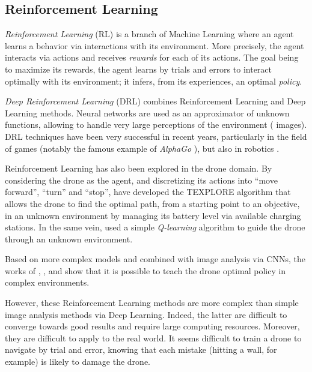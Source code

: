 \subsection{Reinforcement Learning}

\emph{Reinforcement Learning} (RL) is a branch of Machine Learning where an agent learns a behavior via interactions with its environment. More precisely, the agent interacts via actions and receives \emph{rewards} for each of its actions. The goal being to maximize its rewards, the agent learns by trials and errors to interact optimally with its environment; it infers, from its experiences, an optimal \emph{policy}.

\emph{Deep Reinforcement Learning} (DRL) combines Reinforcement Learning and Deep Learning methods. Neural networks are used as an approximator of unknown functions, allowing to handle very large perceptions of the environment (\eg{} images). DRL techniques have been very successful in recent years, particularly in the field of games \cite{shao2019survey} (notably the famous example of \emph{AlphaGo} \cite{silver2016mastering}), but also in robotics \cite{kober2013reinforcement}.

Reinforcement Learning has also been explored in the drone domain. By considering the drone as the agent, and discretizing its actions into \enquote{move forward}, \enquote{turn} and \enquote{stop}, \textcite{imanberdiyev2016autonomous} have developed the TEXPLORE algorithm that allows the drone to find the optimal path, from a starting point to an objective, in an unknown environment by managing its battery level via available charging stations. In the same vein, \textcite{pham2018autonomous} used a simple \emph{Q-learning} algorithm to guide the drone through an unknown environment.

Based on more complex models and combined with image analysis via CNNs, the works of \textcite{walker2019deep}, \textcite{wang2019autonomous}, \textcite{he2020explainable} and \textcite{guerra2020reinforcement} show that it is possible to teach the drone optimal policy in complex environments.

However, these Reinforcement Learning methods are more complex than simple image analysis methods via Deep Learning. Indeed, the latter are difficult to converge towards good results and require large computing resources. Moreover, they are difficult to apply to the real world. It seems difficult to train a drone to navigate by trial and error, knowing that each mistake (hitting a wall, for example) is likely to damage the drone.

